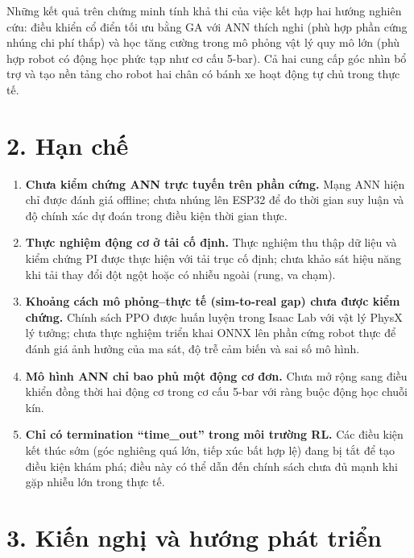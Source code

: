 Những kết quả trên chứng minh tính khả thi của việc kết hợp hai hướng nghiên
cứu: điều khiển cổ điển tối ưu bằng GA với ANN thích nghi (phù hợp phần cứng
nhúng chi phí thấp) và học tăng cường trong mô phỏng vật lý quy mô lớn
(phù hợp robot có động học phức tạp như cơ cấu 5-bar). Cả hai cung cấp
góc nhìn bổ trợ và tạo nền tảng cho robot hai chân có bánh xe hoạt động tự
chủ trong thực tế.


\section*{2. Hạn chế}

\begin{enumerate}[leftmargin=1.5cm, label=\arabic*.]
    \item \textbf{Chưa kiểm chứng ANN trực tuyến trên phần cứng.}
    Mạng ANN hiện chỉ được đánh giá offline; chưa nhúng lên ESP32 để đo
    thời gian suy luận và độ chính xác dự đoán trong điều kiện thời gian thực.

    \item \textbf{Thực nghiệm động cơ ở tải cố định.}
    Thực nghiệm thu thập dữ liệu và kiểm chứng PI được thực hiện với tải
    trục cố định; chưa khảo sát hiệu năng khi tải thay đổi đột ngột
    hoặc có nhiễu ngoài (rung, va chạm).

    \item \textbf{Khoảng cách mô phỏng--thực tế (sim-to-real gap) chưa được
    kiểm chứng.}
    Chính sách PPO được huấn luyện trong Isaac Lab với vật lý PhysX lý tưởng;
    chưa thực nghiệm triển khai ONNX lên phần cứng robot thực để đánh giá
    ảnh hưởng của ma sát, độ trễ cảm biến và sai số mô hình.

    \item \textbf{Mô hình ANN chỉ bao phủ một động cơ đơn.}
    Chưa mở rộng sang điều khiển đồng thời hai động cơ trong cơ cấu 5-bar
    với ràng buộc động học chuỗi kín.

    \item \textbf{Chỉ có termination ``time\_out'' trong môi trường RL.}
    Các điều kiện kết thúc sớm (góc nghiêng quá lớn, tiếp xúc bất hợp lệ)
    đang bị tắt để tạo điều kiện khám phá; điều này có thể dẫn đến chính
    sách chưa đủ mạnh khi gặp nhiễu lớn trong thực tế.
\end{enumerate}


\section*{3. Kiến nghị và hướng phát triển}

